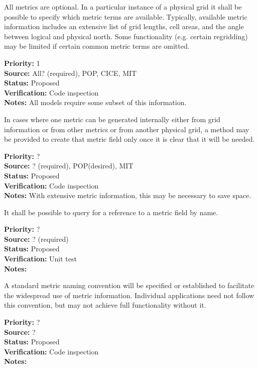 All metrics are optional.  In a particular instance of a physical grid it shall be
possible to specify which metric terms are available.  Typically, available
metric information includes an extensive list of grid lengths, cell areas, and
the angle between logical and physical north.  Some functionality (e.g. certain
regridding) may be limited if certain common metric terms are omitted.
\begin{reqlist}
{\bf Priority:} 1 \\
{\bf Source:} All? (required), POP, CICE, MIT \\
{\bf Status:} Proposed \\
{\bf Verification:} Code inspection \\
{\bf Notes:} All models require some subset of this information.
\end{reqlist}

In cases where one metric can be generated internally either from grid information
or from other metrics or from another physical grid, a method may be provided to create
that metric field only once it is clear that it will be needed.
\begin{reqlist}
{\bf Priority:} ? \\
{\bf Source:} ? (required), POP(desired), MIT \\
{\bf Status:} Proposed \\
{\bf Verification:} Code inspection \\
{\bf Notes:} With extensive metric information, this may be necessary to save space.
\end{reqlist}

It shall be possible to query for a reference to a metric field by name.
\begin{reqlist}
{\bf Priority:} ? \\
{\bf Source:} ? (required) \\
{\bf Status:} Proposed \\
{\bf Verification:} Unit test \\
{\bf Notes:} 
\end{reqlist}

A standard metric naming convention will be specified or established to facilitate
the widespread use of metric information.  Individual applications need not
follow this convention, but may not achieve full functionality without it.
\begin{reqlist}
{\bf Priority:} ? \\
{\bf Source:} ? \\
{\bf Status:} Proposed \\
{\bf Verification:} Code inspection \\
{\bf Notes:} 
\end{reqlist}


